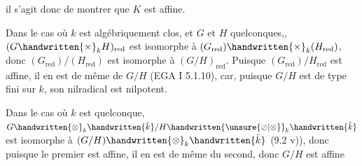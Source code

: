
il s'agit donc de montrer que $K$ est affine.

\deleted{\unsure{)}}

Dans le cas où $k$ est algébriquement clos, et $G$ et $H$ quelconques,, $(G\handwritten{\times}_k H)_{\mathrm{red}}$ est isomorphe à $(G_{\mathrm{red}})\handwritten{\times}_k(H_{\mathrm{red}})$, donc $(G_{\mathrm{red}})/(H_{\mathrm{red}})$ est isomorphe à $(G/H)_{\mathrm{red}}$. Puisque $(G_{\mathrm{red}})/H_{\mathrm{red}}$ est affine, il en est de même de $G/H$ (EGA I 5.1.10), car, puisque $G/H$ est de type fini sur $k$, son nilradical est nilpotent.

Dans le cas où $k$ est quelconque, $G\handwritten{\otimes}_k\handwritten{\bar{k}}/H\handwritten{\unsure{\oslash|\otimes}}_k\handwritten{\bar{k}}$ est isomorphe à $(G/H)\handwritten{\otimes}_k\handwritten{\bar{k}}$ (9.2 v)), donc puisque le premier est affine, il en est de même du second, donc $G/H$ est affine
\margin{\handwritten{(\qquad)}}

